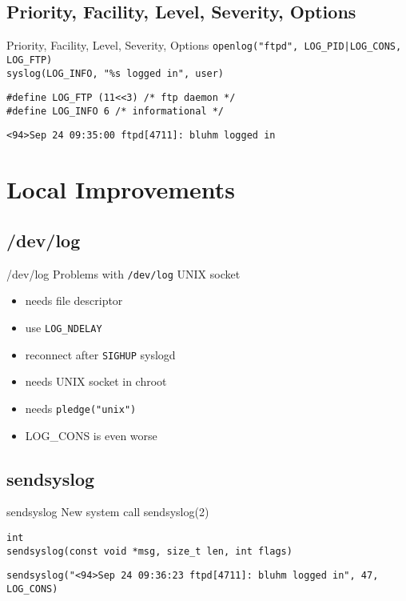\documentclass[14pt]{beamer}
\begin{document}
\subsection{Priority, Facility, Level, Severity, Options}
\begin{frame}{Priority, Facility, Level, Severity, Options}
    \texttt{openlog("ftpd", LOG\_PID|LOG\_CONS, LOG\_FTP)}\\
    \texttt{syslog(LOG\_INFO, "\%s logged in", user)}

    \vspace{.5cm}
    \texttt{\#define LOG\_FTP  (11<<3) /* ftp daemon */}\\
    \texttt{\#define LOG\_INFO 6       /* informational */ }

    \vspace{.5cm}
    \texttt{<94>Sep 24 09:35:00 ftpd[4711]:\ bluhm logged in}
\end{frame}

\section{Local Improvements}

\subsection{/dev/log}
\begin{frame}{/dev/log}
Problems with \texttt{/dev/log} UNIX socket
\begin{itemize}
    \item needs file descriptor
    \item use \texttt{LOG\_NDELAY}
    \item reconnect after \texttt{SIGHUP} syslogd
    \item needs UNIX socket in chroot
    \item needs \texttt{pledge("unix")}
    \item LOG\_CONS is even worse
\end{itemize}
\end{frame}

\subsection{sendsyslog}
\begin{frame}{sendsyslog}
    New system call sendsyslog(2)

    \vspace{.5cm}
    \texttt{int \\
    sendsyslog(const void *msg, size\_t len, int flags)}

    \vspace{.5cm}
    \texttt{sendsyslog("<94>Sep 24 09:36:23 ftpd[4711]:\ 
	bluhm logged in", 47, LOG\_CONS)}
\end{frame}
\end{document}
